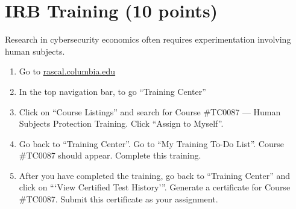 \documentclass[11pt]{article}
\begin{document}
\section*{IRB Training (10 points)}

Research in cybersecurity economics often requires experimentation involving human subjects. 

\begin{enumerate}
    \item Go to \href{rascal.columbia.edu}{rascal.columbia.edu}
    \item In the top navigation bar, to go ``Training Center''
    \item Click on ``Course Listings'' and search for Course \#TC0087 --- Human Subjects Protection Training. Click ``Assign to Myself''.
    \item Go back to ``Training Center''. Go to ``My Training To-Do List''. Course \#TC0087 should appear. Complete this training.
    \item After you have completed the training, go back to ``Training Center'' and click on ```View Certified Test History'''. Generate a certificate for Course \#TC0087. Submit this certificate as your assignment.
\end{enumerate}
\end{document}
